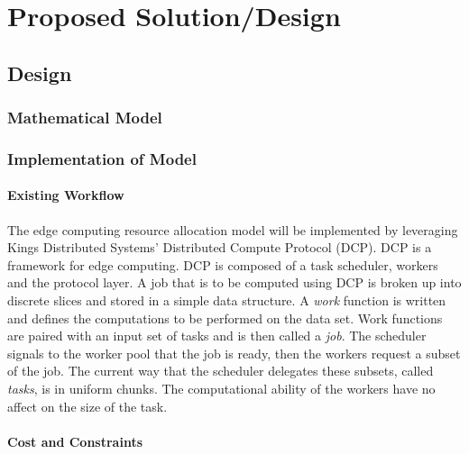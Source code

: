 \documentclass[../mthe-493-project-proposal.tex]{subfiles}
\begin{document}
    \chapter{Proposed Solution/Design}
    \label{ch:proposed-design}
    \blindtext

    \section{Design}
    \blindtext

    \subsection{Mathematical Model}
    \blindtext

    \subsection{Implementation of Model}
    \subsubsection{Existing Workflow}

    The edge computing resource allocation model will be implemented by leveraging  Kings Distributed Systems' Distributed Compute Protocol (DCP). DCP is a framework for edge computing. DCP is composed of a task scheduler, workers and the protocol layer. A job that is to be computed using DCP is broken up into discrete slices and stored in a simple data structure. A \emph{work} function is written and defines the computations to be performed on the data set. Work functions are paired with an input set of tasks and is then called a \emph{job}. The scheduler signals to the worker pool that the job is ready, then the workers request a subset of the job. The current way that the scheduler delegates these subsets, called \emph{tasks}, is in uniform chunks. The computational ability of the workers have no affect on the size of the task.

    \subsubsection{Cost and Constraints}
\end{document}
